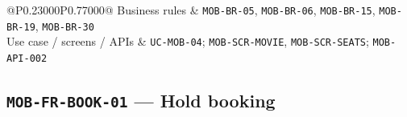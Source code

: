 \begin{longtable}{@{}P{0.23000\SRSWidth}P{0.77000\SRSWidth}@{}}
Business rules & \texttt{MOB-\allowbreak{}BR-\allowbreak{}05}, \texttt{MOB-\allowbreak{}BR-\allowbreak{}06}, \texttt{MOB-\allowbreak{}BR-\allowbreak{}15}, \texttt{MOB-\allowbreak{}BR-\allowbreak{}19}, \texttt{MOB-\allowbreak{}BR-\allowbreak{}30} \\[3pt]
Use case /\allowbreak{} screens /\allowbreak{} APIs & \texttt{UC-\allowbreak{}MOB-\allowbreak{}04}; \texttt{MOB-\allowbreak{}SCR-\allowbreak{}MOVIE}, \texttt{MOB-\allowbreak{}SCR-\allowbreak{}SEATS}; \texttt{MOB-\allowbreak{}API-\allowbreak{}002} \\[3pt]
\end{longtable}
\endgroup

\subsection{\texttt{MOB-\allowbreak{}FR-\allowbreak{}BOOK-\allowbreak{}01} — Hold booking}
\begingroup
\fontsize{9.5}{12}\selectfont
\setlength{\SRSWidth}{\dimexpr\linewidth-2\tabcolsep\relax}
